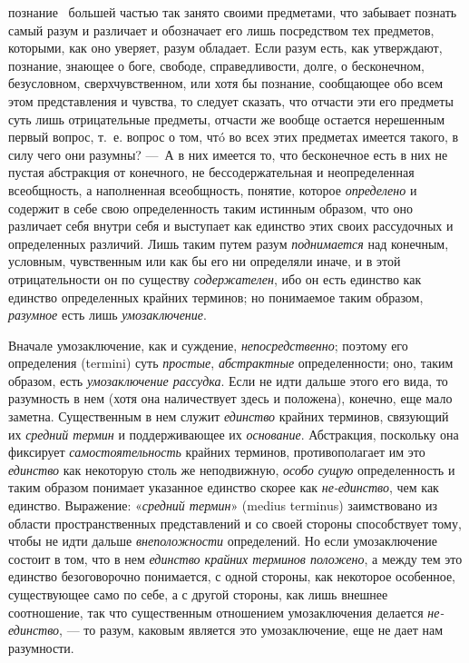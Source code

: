 \documentclass[twoside]{article}
\begin{document}
{{{познание~\label{bkm:bm47}
большей частью так занято своими предметами, что забывает
познать самый разум и различает и обозначает его лишь посредством тех
предметов, которыми, как оно уверяет, разум обладает. Если разум есть, как
утверждают, познание, знающее о боге, свободе, справедливости, долге, о
бесконечном, безусловном, сверхчувственном, или хотя бы познание,
сообщающее обо всем этом представления и чувства, то следует сказать, что
отчасти эти его предметы суть лишь отрицательные предметы, отчасти же
вообще остается нерешенным первый вопрос, т.~е. вопрос о том, чтó во всех
этих предметах имеется такого, в силу чего они разумны? —~А
в них имеется то, что бесконечное есть в них не пустая абстракция от
конечного, не бессодержательная и неопределенная всеобщность, а наполненная
всеобщность, понятие, которое
{\em определено} и
содержит в себе свою определенность таким истинным образом, что оно
различает себя внутри себя и выступает как единство этих своих рассудочных
и определенных различий. Лишь таким путем разум
{\em поднимается} над
конечным, условным, чувственным или как бы его ни определяли иначе, и в
этой отрицательности он по существу
{\em содержателен}, ибо
он есть единство как единство определенных крайних терминов; но понимаемое
таким образом, {\em разумное}
есть лишь
{\em умозаключение}.

Вначале умозаключение, как и суждение,
{\em непосредственно};
поэтому его определения (termini) суть
{\em простые},
{\em абстрактные}
определенности; оно, таким образом, есть
{\em умозаключение рассудка}.
Если не идти дальше этого его вида, то разумность в нем (хотя
она наличествует здесь и положена), конечно, еще мало заметна. Существенным
в нем служит {\em единство}
крайних терминов, связующий их
{\em средний термин} и
поддерживающее их {\em основание}.
Абстракция, поскольку она фиксирует
{\em самостоятельность}
крайних терминов, противополагает им это
{\em единство} как
некоторую столь же неподвижную,
{\em особо сущую}
определенность и таким образом понимает
указанное единство скорее как
{\em не-единство}, чем
как единство. Выражение: «{\em средний
термин}» (medius terminus) заимствовано из области
пространственных представлений и со своей стороны способствует тому, чтобы
не идти дальше {\em внеположности}
определений. Но если умозаключение состоит в том, что в нем
{\em единство крайних терминов
положено}, а между тем это единство безоговорочно
понимается, с одной стороны, как некоторое особенное, существующее само по
себе, а с другой стороны, как лишь внешнее соотношение, так что
существенным отношением умозаключения делается
{\em не-единство}, — то
разум, каковым является это умозаключение, еще не дает нам разумности.

}}}
\end{document}
